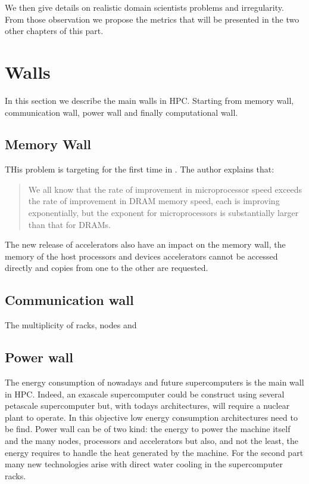 We then give details on realistic domain scientists problems and irregularity.
From those observation we propose the metrics that will be presented in the two other chapters of this part. 

\section{Walls}
In this section we describe the main walls in HPC.
Starting from memory wall, communication wall, power wall and finally computational wall.

\subsection{Memory Wall}
THis problem is targeting for the first time in \cite{wulf1995hitting}.
The author explains that:

\begin{quotation} We all know that the rate of improvement in microprocessor speed exceeds the rate of
improvement in DRAM memory speed, each is improving exponentially, but the
exponent for microprocessors is substantially larger than that for DRAMs.
\end{quotation} 

The new release of accelerators also have an impact on the memory wall, the memory of the host processors and devices accelerators cannot be accessed directly and copies from one to the other are requested.

\subsection{Communication wall} 
The multiplicity of racks, nodes and 

\subsection{Power wall}
The energy consumption of nowadays and future supercomputers is the main wall in HPC. 
Indeed, an exascale supercomputer could be construct using several petascale supercomputer but, with todays architectures, will require a nuclear plant to operate. 
In this objective low energy consumption architectures need to be find. 
Power wall can be of two kind: the energy to power the machine itself and the many nodes, processors and accelerators but also, and not the least, the energy requires to handle the heat generated by the machine. 
For the second part many new technologies arise with direct water cooling in the supercomputer racks.

